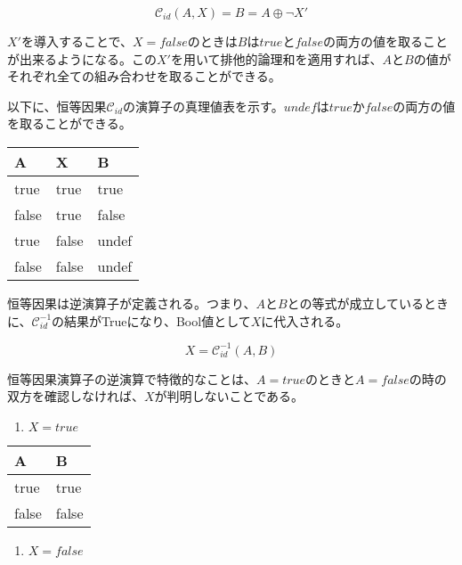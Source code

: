 \documentclass[12pt]{article}
\begin{document}
\begin{equation} \mathcal{C}_{id}(A,X) = B=A \oplus \neg X' \end{equation}

\(X'\)を導入することで、\(X=false\)のときは\(B\)は\(true\)と\(false\)の両方の値を取ることが出来るようになる。この\(X'\)を用いて排他的論理和を適用すれば、\(A\)と\(B\)の値がそれぞれ全ての組み合わせを取ることができる。

以下に、恒等因果\(\mathcal{C}_{id}\)の演算子の真理値表を示す。\(undef\)は\(true\)か\(false\)の両方の値を取ることができる。

\begin{longtable}[]{@{}lll@{}}
\toprule\noalign{}
A & X & B \\
\midrule\noalign{}
\endhead
\bottomrule\noalign{}
\endlastfoot
true & true & true \\
false & true & false \\
true & false & undef \\
false & false & undef \\
\end{longtable}

恒等因果は逆演算子が定義される。つまり、\(A\)と\(B\)との等式が成立しているときに、\(\mathcal{C}_{id}^{-1}\)の結果がTrueになり、Bool値として\(X\)に代入される。

\begin{equation} X=\mathcal{C}_{id}^{-1}(A,B)\end{equation}

恒等因果演算子の逆演算で特徴的なことは、\(A=true\)のときと\(A=false\)の時の双方を確認しなければ、\(X\)が判明しないことである。

\begin{enumerate}
\def\labelenumi{\arabic{enumi}.}

\item
  \(X=true\)
\end{enumerate}

\begin{longtable}[]{@{}ll@{}}
\toprule\noalign{}
A & B \\
\midrule\noalign{}
\endhead
\bottomrule\noalign{}
\endlastfoot
true & true \\
false & false \\
\end{longtable}

\begin{enumerate}
\def\labelenumi{\arabic{enumi}.}
\setcounter{enumi}{1}

\item
  \(X=false\)
\end{enumerate}
\end{document}
